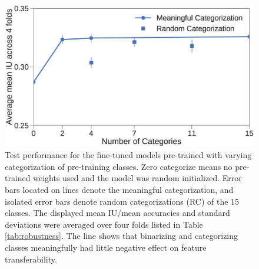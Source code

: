\begin{figure}[t]
\centering
   \includegraphics[width=1.\linewidth]{img/num_classes.eps}
\caption{
Test performance for the fine-tuned models pre-trained with varying categorization of pre-training classes.
Zero categorize means no pre-trained weights used and the model was random initialized.
Error bars located on lines denote the meaningful categorization, and isolated error bars denote random categorizations (RC) of the 15 classes.
The displayed mean IU/mean accuracies and standard deviations were averaged over four folds listed in Table \ref{tab:robustness}.
The line shows that binarizing and categorizing classes meaningfully had little negative effect on feature transferability.
}
\label{fig:categories}
\end{figure}
